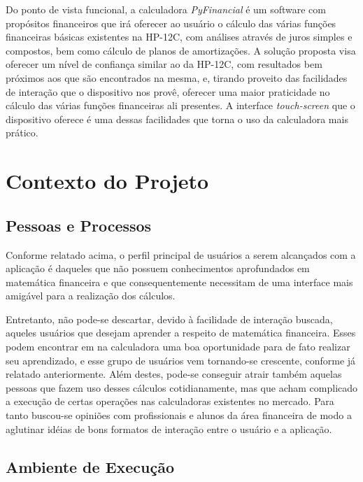 Do ponto de vista funcional, a calculadora \textit{PyFinancial} é um software com propósitos financeiros que irá oferecer ao usuário o cálculo das várias funções financeiras básicas existentes na HP-12C, com análises através de juros simples e compostos, bem como cálculo de planos de amortizações.  A solução proposta visa oferecer um nível de confiança similar ao da HP-12C, com resultados bem próximos aos que são encontrados na mesma, e, tirando proveito das facilidades de interação que o dispositivo nos provê, oferecer uma maior praticidade no cálculo das várias funções financeiras ali presentes. A interface \textit{touch-screen} que o dispositivo oferece é uma dessas facilidades que torna o uso da calculadora mais prático.


\section{Contexto do Projeto}

\subsection{Pessoas e Processos}

Conforme relatado acima, o perfil principal de usuários a serem alcançados com a aplicação é daqueles que não possuem conhecimentos aprofundados em matemática financeira e que consequentemente necessitam de uma interface mais amigável para a realização dos cálculos.

Entretanto, não pode-se descartar, devido à facilidade de interação buscada, aqueles usuários que desejam aprender a respeito de matemática financeira. Esses podem encontrar em na calculadora uma boa oportunidade para de fato realizar seu aprendizado, e esse grupo de usuários vem tornando-se crescente, conforme já relatado anteriormente. Além destes, pode-se conseguir atrair também aquelas pessoas que fazem uso desses cálculos cotidianamente, mas que acham complicado a execução de certas operações nas calculadoras existentes no mercado. Para tanto buscou-se opiniões com profissionais e alunos da área financeira de modo a aglutinar idéias de bons formatos de interação entre o usuário e a aplicação.


\subsection{Ambiente de Execução}

